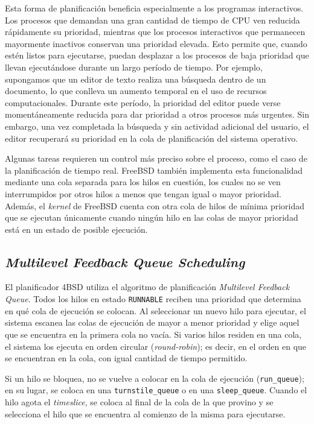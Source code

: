 Esta forma de planificación beneficia especialmente a los programas interactivos. Los procesos que demandan una gran cantidad de tiempo de CPU ven reducida rápidamente su prioridad, mientras que los procesos interactivos que permanecen mayormente inactivos conservan una prioridad elevada. Esto permite que, cuando estén listos para ejecutarse, puedan desplazar a los procesos de baja prioridad que llevan ejecutándose durante un largo período de tiempo. Por ejemplo, supongamos que un editor de texto realiza una búsqueda dentro de un documento, lo que conlleva un aumento temporal en el uso de recursos computacionales. Durante este período, la prioridad del editor puede verse momentáneamente reducida para dar prioridad a otros procesos más urgentes. Sin embargo, una vez completada la búsqueda y sin actividad adicional del usuario, el editor recuperará su prioridad en la cola de planificación del sistema operativo.\par

Algunas tareas requieren un control más preciso sobre el proceso, como el caso de la planificación de tiempo real. FreeBSD también implementa esta funcionalidad mediante una cola separada para los hilos en cuestión, los cuales no se ven interrumpidos por otros hilos a menos que tengan igual o mayor prioridad. Además, el \textit{kernel} de FreeBSD cuenta con otra cola de hilos de mínima prioridad que se ejecutan únicamente cuando ningún hilo en las colas de mayor prioridad está en un estado de posible ejecución.\par

\subsection{\textit{Multilevel Feedback Queue Scheduling}}

El planificador 4BSD utiliza el algoritmo de planificación \textit{Multilevel Feedback Queue}. Todos los hilos en estado \texttt{RUNNABLE} reciben una prioridad que determina en qué cola de ejecución se colocan. Al seleccionar un nuevo hilo para ejecutar, el sistema escanea las colas de ejecución de mayor a menor prioridad y elige aquel que se encuentra en la primera cola no vacía. Si varios hilos residen en una cola, el sistema los ejecuta en orden circular (\textit{round-robin}); es decir, en el orden en que se encuentran en la cola, con igual cantidad de tiempo permitido.\par

Si un hilo se bloquea, no se vuelve a colocar en la cola de ejecución (\texttt{run\_queue}); en su lugar, se coloca en una \texttt{turnstile\_queue} o en una \texttt{sleep\_queue}. Cuando el hilo agota el \textit{timeslice}, se coloca al final de la cola de la que provino y se selecciona el hilo que se encuentra al comienzo de la misma para ejecutarse.\par

